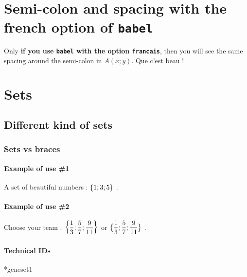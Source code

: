 \documentclass[12pt,a4paper]{article}
\makeatletter
\theoremstyle{definition}
\newcommand\IDmacro{\@ifstar{\@IDmacro@star}{\@IDmacro@no@star}}
\newcommand\@IDmacro@no@star[3]{%
        \texttt{%
        	\textbackslash#1%
        	\IfStrEq{#2}{0}{}{%
        		\,\,[#2 Option%
				\IfStrEq{#2}{1}{}{s}]%
			}%
    	    \IfStrEq{#3}{}{}{%
	    		\,\,(#3 Argument%
				\IfStrEq{#3}{1}{}{s})%
			}
	   	}
        \immediate\write\tempfile{macro,#1,#2,#3}%
    }
\newcommand\@IDmacro@star[2]{%
        \@IDmacro@no@star{#1}{0}{#2}%
    }
\makeatother
\begin{document}
\section{Semi-colon and spacing with the french option of \texttt{babel}}

\begin{tcblisting}{}
Only \textbf{if you use \texttt{babel} with the option \texttt{francais}}, then
you will see the same spacing around the semi-colon in $A(x;y)$. Que c'est beau !
\end{tcblisting}




\section{Sets}

    \subsection{Different kind of sets}

        \subsubsection{Sets vs braces}

            \paragraph{Example of use \#1}

\begin{tcblisting}{}
A set of beautiful numbers : $\geneset{1 ; 3 ; 5}$ .
\end{tcblisting}


            \paragraph{Example of use \#2}

\begin{tcblisting}{}
Choose your team :
$\displaystyle \geneset{\frac{1}{3} ; \frac{5}{7} ; \frac{9}{11}}$
or 
$\displaystyle \geneset*{\frac{1}{3} ; \frac{5}{7} ; \frac{9}{11}}$ .
\end{tcblisting}


            \paragraph{Technical IDs}

\IDmacro*{geneset}{1}
\end{document}
